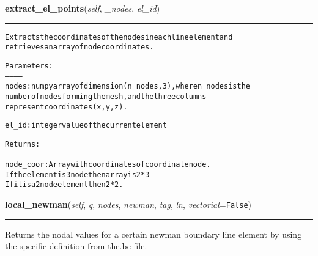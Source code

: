 \hspace{.8\funcindent}\begin{boxedminipage}{\funcwidth}

    \raggedright \textbf{extract\_el\_points}(\textit{self}, \textit{\_nodes}, \textit{el\_id})

    \vspace{-1.5ex}

    \rule{\textwidth}{0.5\fboxrule}
\setlength{\parskip}{2ex}
\begin{alltt}

Extracts the coordinates of the nodes in each line element and
retrieves an array of node coordinates.

Parameters:
-----------
nodes:  numpy array of dimension (n\_nodes, 3), where n\_nodes is the 
        number of nodes forming the mesh, and the three columns 
        represent coordinates (x, y, z).
            
el\_id:   integer value of the current element

Returns:
--------
node\_coor: Array with coordinates of coordinate node. 
           If the element is 3 node then array is 2*3
           If it is a 2 node element then 2*2.
\end{alltt}

\setlength{\parskip}{1ex}
    \end{boxedminipage}

    \label{Classes:Lines:local_newman}

    \vspace{0.5ex}

\hspace{.8\funcindent}\begin{boxedminipage}{\funcwidth}

    \raggedright \textbf{local\_newman}(\textit{self}, \textit{q}, \textit{nodes}, \textit{newman}, \textit{tag}, \textit{ln}, \textit{vectorial}={\tt False})

    \vspace{-1.5ex}

    \rule{\textwidth}{0.5\fboxrule}
\setlength{\parskip}{2ex}
    Returns the nodal values for a certain newman boundary line element by 
    using the specific definition from the.bc file.

\setlength{\parskip}{1ex}
    \end{boxedminipage}

    \label{Classes:Lines:numeric_J}

